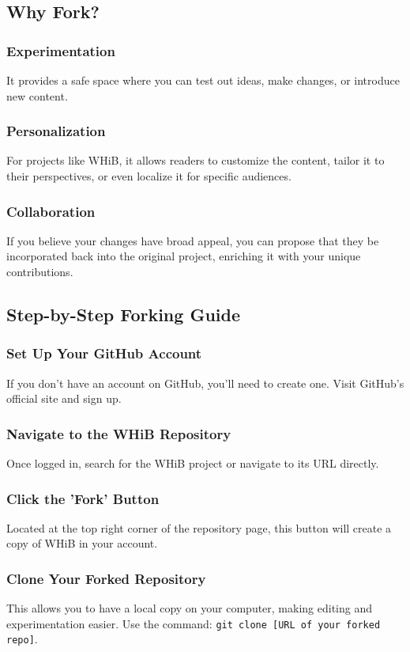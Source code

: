\documentclass[a4paper,12pt]{book}
\begin{document}
\subsection*{Why Fork?}
\subsubsection*{Experimentation}
It provides a safe space where you can test out ideas, make changes, or introduce new content.

\subsubsection*{Personalization}
For projects like WHiB, it allows readers to customize the content, tailor it to their perspectives, or even localize it for specific audiences.

\subsubsection*{Collaboration}
If you believe your changes have broad appeal, you can propose that they be incorporated back into the original project, enriching it with your unique contributions.

\subsection*{Step-by-Step Forking Guide}
\subsubsection*{Set Up Your GitHub Account}
If you don't have an account on GitHub, you'll need to create one. Visit GitHub's official site and sign up.

\subsubsection*{Navigate to the WHiB Repository}
Once logged in, search for the WHiB project or navigate to its URL directly.

\subsubsection*{Click the 'Fork' Button}
Located at the top right corner of the repository page, this button will create a copy of WHiB in your account.

\subsubsection*{Clone Your Forked Repository}
This allows you to have a local copy on your computer, making editing and experimentation easier. Use the command: \texttt{git clone [URL of your forked repo]}.
\end{document}
